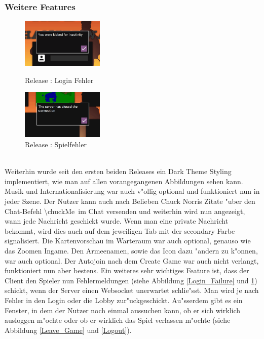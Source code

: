 \documentclass[12pt, titlepage]{scrartcl}
\newcommand{\RN}[1]{%
	\textup{\uppercase\expandafter{\romannumeral#1}}%
}
\begin{document}
		    \subsubsection{Weitere Features}
		        \begin{figure}
                    \begin{center}
                        \includegraphics[width=0.35\textwidth]{images/old_state/additional/LoginFailure.png}
                        \caption{Release \RN{2}: Login Fehler}
                        \label{Login_Failure}
                    \end{center}
                    \begin{center}
                        \includegraphics[width=0.35\textwidth]{images/old_state/additional/WaitingRoomFailure.png}
                        \caption{Release \RN{2}: Spielfehler}
                        \label{Game_Failure}
                    \end{center}
                \end{figure}
		        \ \\ Weiterhin wurde seit den ersten beiden Releases ein Dark Theme Styling implementiert, wie man auf allen vorangegangenen Abbildungen sehen kann. Musik und Internationalisierung war auch v"ollig optional und funktioniert nun in jeder Szene. Der Nutzer kann auch nach Belieben Chuck Norris Zitate "uber den Chat-Befehl \glqq \textbackslash chuckMe\grqq\ im Chat versenden und weiterhin wird nun angezeigt, wann jede Nachricht geschickt wurde. Wenn man eine private Nachricht bekommt, wird dies auch auf dem jeweiligen Tab mit der secondary Farbe signalisiert. Die Kartenvorschau im Warteraum war auch optional, genauso wie das Zoomen Ingame. Den Armeenamen, sowie das Icon dazu "andern zu k"onnen, war auch optional. Der Autojoin nach dem Create Game war auch nicht verlangt, funktioniert nun aber bestens. Ein weiteres sehr wichtiges Feature ist, dass der Client den Spieler nun Fehlermeldungen (siehe Abbildung \ref{Login_Failure} und \ref{Game_Failure}) schickt, wenn der Server einen Websocket unerwartet schlie"sst. Man wird je nach Fehler in den Login oder die Lobby zur"uckgeschickt. Au"sserdem gibt es ein Fenster, in dem der Nutzer noch einmal aussuchen kann, ob er sich wirklich ausloggen m"ochte oder ob er wirklich das Spiel verlassen m"ochte (siehe Abbildung \ref{Leave_Game} und \ref{Logout}). \\
\end{document}
